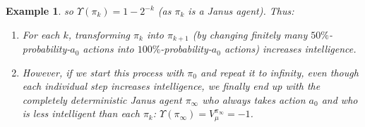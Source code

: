 \documentclass{article}
\newtheorem{example}[theorem]{Example}
\begin{document}
\begin{example}
    so $\Upsilon(\pi_k)=1-2^{-k}$ (as $\pi_k$ is a Janus agent).
    Thus:
    \begin{enumerate}
        \item For each $k$, transforming $\pi_k$ into $\pi_{k+1}$
            (by changing finitely many $50\%$-probability-$a_0$
            actions into $100\%$-probability-$a_0$ actions)
            \emph{increases} intelligence.
        \item However, if we start this process with $\pi_0$ and
            repeat it to infinity, even though each individual step
            \emph{increases} intelligence, we finally end up with
            the completely deterministic
            Janus agent $\pi_{\infty}$ who always takes action $a_0$ and who is
            \emph{less} intelligent than each $\pi_k$:
            $\Upsilon(\pi_{\infty})=V^{\pi_\infty}_\mu=-1$.
    \end{enumerate}
\end{example}



\end{document}
